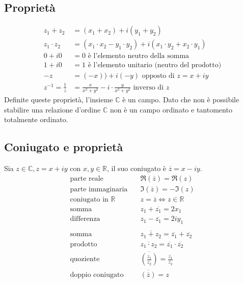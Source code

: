 \documentclass[a4paper]{article}
\begin{document}
\subsection{Proprietà}
\begin{align*}
	z_1 + z_2 &= (x_1 + x_2) + i (y_1 + y_2) \\
	z_1 \cdot z_2 &= (x_1 \cdot x_2 - y_1 \cdot y_2) + i (x_1 \cdot y_2 + x_2 \cdot y_1)\\
	0 + i0 &= 0 \text{ è l'elemento neutro della somma} \\
	1 + i0 &= 1 \text{ è l'elemento unitario (neutro del prodotto)} \\
	-z &= (-x)) + i(-y) \text{ opposto di } z = x + iy \\
	z^{-1} = \frac{1}{z} &= \frac{x}{x^2 + y^2} - i \cdot \frac{y}{x^2 + y^2} \text{ inverso di } z
\end{align*}
Definite queste proprietà, l'insieme \(\mathbb{C}\) è un campo. Dato che non è possibile stabilire una relazione d'ordine \(\mathbb{C}\) non è un campo ordinato e tantomento totalmente ordinato.


\subsection{Coniugato e proprietà}
Sia \(z \in \mathbb{C}, z = x + i y\) con \(x,y \in \mathbb{R}\), il suo coniugato è \(\overline{z} = x - iy\).
\begin{align*}
	\text{parte reale} \quad & \Re(\overline{z}) = \Re(z) \\
	\text{parte immaginaria} \quad & \Im(\overline{z}) = -\Im(z) \\
	\text{coniugato in } \mathbb{R} \quad & z = \overline{z} \Leftrightarrow z \in \mathbb{R} \\
	\text{somma} \quad & z_1 + \overline{z_1} = 2 x_1 \\
	\text{differenza} \quad & z_1 - \overline{z_1} = 2 i y_1 \\
	\\
	\text{somma} \quad & \overline{z_1 + z_2} = \overline{z_1} + \overline{z_2} \\
	\text{prodotto} \quad & \overline{z_1 \cdot z_2} = \overline{z_1} \cdot \overline{z_2} \\
	\text{quoziente} \quad & \overline{\left( \frac{z_1}{z_2} \right)} = \frac{\overline{z_1}}{\overline{z_2}} \\
	\text{doppio coniugato} \quad & \overline{\left( \overline{z} \right)} = z \\
\end{align*}
\end{document}
